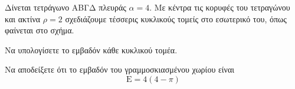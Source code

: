 Δίνεται τετράγωνο ΑΒΓΔ πλευράς $\alpha = 4$. Με κέντρα τις κορυφές του τετραγώνου και ακτίνα $\rho = 2$ σχεδιάζουμε τέσσερις κυκλικούς τομείς στο εσωτερικό του, όπως φαίνεται στο σχήμα.
\begin{alist}
    \item Να υπολογίσετε το εμβαδόν κάθε κυκλικού τομέα. 
    \item Να αποδείξετε ότι το εμβαδόν του γραμμοσκιασμένου χωρίου είναι
    \[ \text{Ε} = 4(4 - \pi) \] 
\end{alist}
